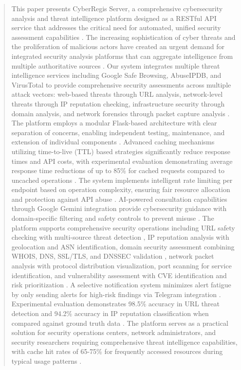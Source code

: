 \documentclass[conference]{IEEEtran}
\begin{document}
\begin{abstract}
This paper presents CyberRegis Server, a comprehensive cybersecurity analysis and threat intelligence platform designed as a RESTful API service that addresses the critical need for automated, unified security assessment capabilities \cite{b1}. The increasing sophistication of cyber threats and the proliferation of malicious actors have created an urgent demand for integrated security analysis platforms that can aggregate intelligence from multiple authoritative sources \cite{b2}. Our system integrates multiple threat intelligence services including Google Safe Browsing, AbuseIPDB, and VirusTotal to provide comprehensive security assessments across multiple attack vectors: web-based threats through URL analysis, network-level threats through IP reputation checking, infrastructure security through domain analysis, and network forensics through packet capture analysis \cite{b5}. The platform employs a modular Flask-based architecture with clear separation of concerns, enabling independent testing, maintenance, and extension of individual components \cite{b20}. Advanced caching mechanisms utilizing time-to-live (TTL) based strategies significantly reduce response times and API costs, with experimental evaluation demonstrating average response time reductions of up to 85\% for cached requests compared to uncached operations \cite{b18,b19}. The system implements intelligent rate limiting per endpoint based on operation complexity, ensuring fair resource allocation and protection against API abuse \cite{b9}. AI-powered consultation capabilities through Google Gemini integration provide cybersecurity guidance with domain-specific filtering and safety controls to prevent misuse \cite{b15,b16}. The platform supports comprehensive security operations including URL safety checking with multi-source threat detection \cite{b13}, IP reputation analysis with geolocation and ASN identification, domain security assessment combining WHOIS, DNS, SSL/TLS, and DNSSEC validation \cite{b5,b9}, network packet analysis with protocol distribution visualization, port scanning for service identification, and vulnerability assessment with CVE identification and risk prioritization \cite{b9}. A selective notification system minimizes alert fatigue by only sending alerts for high-risk findings via Telegram integration \cite{b2}. Experimental evaluation demonstrates 98.5\% accuracy in URL threat detection and 94.2\% accuracy in IP reputation classification when compared against ground truth data \cite{b13,b14}. The platform serves as a practical solution for security operations centers, network administrators, and security researchers requiring comprehensive threat intelligence capabilities, with cache hit rates of 65-75\% for frequently accessed resources during typical usage patterns \cite{b18}.
\end{abstract}
\end{document}
